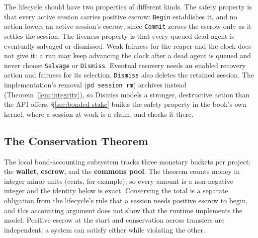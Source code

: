 \documentclass[11pt,a4paper]{article}
\theoremstyle{definition}
\theoremstyle{remark}
\begin{document}
The lifecycle should have two properties of different kinds. The safety
property is that every active session carries positive escrow:
\texttt{Begin} establishes it, and no action lowers an active session's
escrow, since \texttt{Commit} zeroes the escrow only as it settles the
session. The liveness property is that every queued dead agent is eventually
salvaged or dismissed. Weak fairness for the reaper and the clock does not
give it: a run may keep advancing the clock after a dead agent is queued and
never choose \texttt{Salvage} or \texttt{Dismiss}. Eventual recovery needs an
enabled recovery action and fairness for its selection. \texttt{Dismiss} also
deletes the retained session. The implementation's removal
(\texttt{pd session rm}) archives instead (Theorem~\ref{lem:integrity}), so
Dismiss models a stronger, destructive action than the API offers.
\S\ref{sec:bonded-stake} builds the safety property in the book's own
kernel, where a session at work is a claim, and checks it there.

\subsection{The Conservation Theorem}\label{sec:conservation}

%
The local bond-accounting subsystem tracks three monetary buckets per project: the \textbf{wallet}, \textbf{escrow}, and the \textbf{commons pool}. The theorem counts money in integer minor units (cents, for example), so every amount is a non-negative integer and the identity below is exact. Conserving the total is a separate obligation from the lifecycle's rule that a session needs positive escrow to begin, and this accounting argument does not show that the runtime implements the model.
Positive escrow at the start and conservation across transfers are independent:
a system can satisfy either while violating the other.
\end{document}
